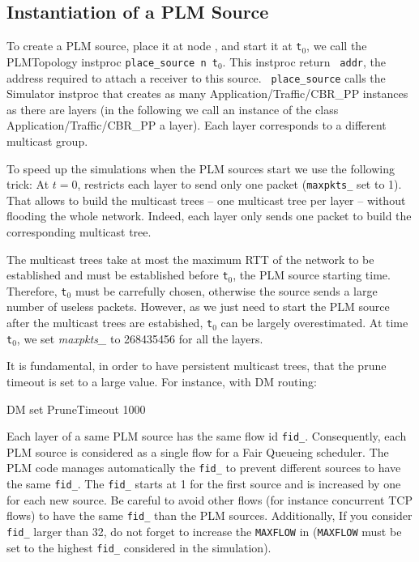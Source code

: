 {\subsection{Instantiation of a PLM Source}
To create a PLM source, place it at node , and start it at {\tt t$_0$},  we call
the PLMTopology instproc {\tt place\_source n t$_0$}. This instproc return {\tt
addr}, the address required to attach a receiver to this source. {\tt
place\_source} calls the Simulator instproc  that
creates as many 
Application/Traffic/CBR\_PP instances as there are layers (in the following we call an
instance of the class Application/Traffic/CBR\_PP a layer). Each layer corresponds to a
different multicast group. 

To speed up the simulations when the PLM sources start we use the
following trick:
At $t=0$,  restricts each
layer to send
only one packet ({\tt maxpkts\_} set to 1). That allows to build the multicast trees
-- one multicast tree per layer -- without flooding the whole network. Indeed,
each layer only sends one packet to build the corresponding multicast tree. 

The multicast trees take at most the maximum RTT of the network to be established and
must be established before {\tt t$_0$}, the PLM source starting time. Therefore,
{\tt t$_0$} must be carrefully chosen, otherwise the source sends a large number of 
useless packets. However, as 
we just need to start the PLM source after the multicast trees are estabished,
{\tt t$_0$} can be largely overestimated. 
At time {\tt t$_0$}, we set {\it maxpkts\_} to 268435456 for all the layers.

It is fundamental, in order to have persistent multicast trees, that the
prune timeout is set to a large value. For instance, with DM routing: 
\begin{program}
  DM set PruneTimeout 1000
\end{program}

Each layer of a same PLM source has the same flow id {\tt fid\_}. Consequently,
each PLM source is considered as a single flow for a Fair Queueing
scheduler. The PLM code manages automatically the {\tt fid\_} to prevent different
sources to have the same {\tt fid\_}. The {\tt fid\_} starts at 1 for the first
source and is increased by one for each new source. Be careful to avoid other
flows (for instance concurrent TCP flows) to have the same {\tt fid\_} than the
PLM sources. Additionally, If you consider {\tt fid\_} larger than 32, do not
forget to increase the {\tt MAXFLOW} in  ({\tt MAXFLOW} must be set
to the highest {\tt fid\_} considered in the simulation).


}
